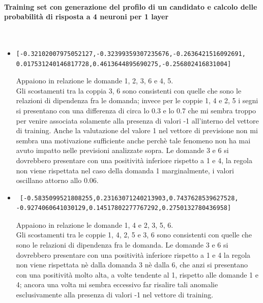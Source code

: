 \paragraph{Training set con generazione del profilo di un candidato e calcolo delle probabilit\`a di risposta a 4 neuroni per 1 layer}\mbox{}
\label{Training set con generazione del profilo di un candidato e calcolo delle probabilita di risposta a 4 neuroni per 1 layer}
\\
\noindent
\begin{itemize}
\item \begin{verbatim}[-0.32102007975052127,-0.32399359307235676,-0.2636421516092691,
0.017531240146817728,0.4613644895690275,-0.256802416831004]
\end{verbatim}
Appaiono in relazione le domande 1, 2, 3, 6  e 4, 5.\\
Gli scostamenti tra la coppia 3, 6 sono consistenti con quelle che sono le relazioni di dipendenza fra le domanda; invece per le coppie 1, 4 e 2, 5 i segni si presentano con una differenza di circa lo 0.3 e lo  0.7 che mi sembra troppo per venire associata solamente alla presenza di valori -1 all'interno del vettore di training. Anche la valutazione del valore 1 nel vettore di previsione non mi sembra una motivazione sufficiente anche perch\`e tale fenomeno non ha mai avuto impatto nelle previsioni analizzate sopra.
Le domande 3 e 6 si dovrebbero presentare con una positivit\`a inferiore rispetto a 1 e 4, la regola non viene rispettata nel caso della domanda 1 marginalmente, i valori oscillano attorno allo 0.06.

\item \begin{verbatim} [-0.5835099521808255,0.23163071240213903,0.7437628539627528,
-0.9274060641030129,0.14517802277767292,0.2750132780436958]
\end{verbatim}
Appaiono in relazione le domande 1, 4 e 2, 3, 5, 6.\\
Gli scostamenti tra le coppie 1, 4, 2, 5 e 3, 6 sono consistenti con quelle che sono le relazioni di dipendenza fra le domanda.
Le domande 3 e 6 si dovrebbero presentare con una positivit\`a inferiore rispetto a 1 e 4 la regola non viene rispettata n\`e dalla domanda 3 n\`e dalla 6, che anzi si presentano con una positivit\`a molto alta, a volte tendente al 1, rispetto alle domande 1 e 4; ancora una volta mi sembra eccessivo far risalire tali anomalie esclusivamente alla presenza di valori -1 nel vettore di training.


\end{itemize}
